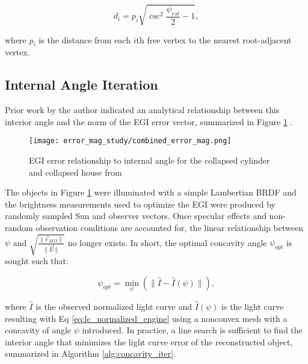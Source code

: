 \begin{equation} \label{eq:flip_depth}
  d_i = p_i \sqrt{\csc^2 \frac{\psi_{est}}{2} - 1},
\end{equation}

where $p_i$ is the distance from each $i$th free vertex to the nearest root-adjacent vertex.

\subsection{Internal Angle Iteration}

Prior work by the author indicated an analytical relationship between this interior angle and the norm of the EGI error vector, summarized in Figure \ref{fig:misleading_egi_error} \cite{robinson2022}.

\begin{figure}[!htb]
  \centering
  \texttt{[image: error\_mag\_study/combined\_error\_mag.png]}
  \caption{EGI error relationship to internal angle for the collapsed cylinder and collapsed house from \cite{robinson2022}}
  \label{fig:misleading_egi_error}
\end{figure}

The objects in Figure \ref{fig:misleading_egi_error} were illuminated with a simple Lambertian BRDF and the brightness measurements used to optimize the EGI were produced by randomly sampled Sun and observer vectors. Once specular effects and non-random observation conditions are accounted for, the linear relationship between $\psi$ and $\sqrt{\frac{\|\vec{e}_{EGI}\|}{\|\vec{E}\|}}$ no longer exists. In short, the optimal concavity angle $\psi_{opt}$ is sought such that:

\begin{equation} \label{eq:psi_opt}
  \psi_{opt} = \min_{\psi} \left( \| \hat{I} - \hat{I}(\psi) \| \right),
\end{equation}

where $\hat{I}$ is the observed normalized light curve and $\hat{I}(\psi)$ is the light curve resulting with Eq \ref{eq:lc_normalized_engine} using a nonconvex mesh with a concavity of angle $\psi$ introduced. In practice, a line search is sufficient to find the interior angle that minimizes the light curve error of the reconstructed object, summarized in Algorithm \ref{alg:concavity_iter}.

